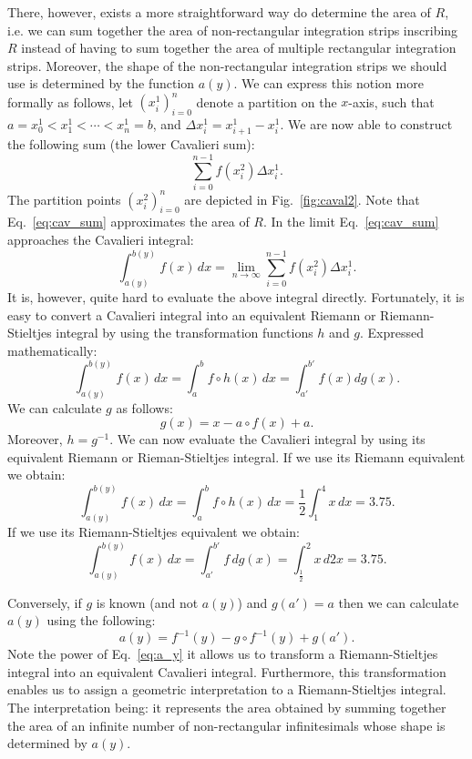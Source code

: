 \documentclass{article}
\theoremstyle{theorem}
\theoremstyle{definition}
\begin{document}
\noindent
There, however, exists a more straightforward way do determine the area of $R$, i.e. we can sum together the area of non-rectangular integration strips inscribing $R$ instead of
having to sum together the area of multiple rectangular integration strips. Moreover, the shape of the non-rectangular integration strips we should use is determined by the function $a(y)$. We can express this notion more formally as 
follows, let $(x_i^1)_{i=0}^{n}$ denote a partition on the $x$-axis, such that $a = x_0^1 < x_1^1 < \cdots < x_n^1 = b$, and $\Delta x_i^1 = x_{i+1}^1 - x_i^1$.
We are now able to construct the following sum (the lower Cavalieri sum):
\begin{equation}
\label{eq:cav_sum}
\sum_{i=0}^{n-1} f(x_i^2)\Delta x_i^1.
\end{equation}
The partition points $(x_i^2)_{i=0}^{n}$ are depicted in Fig.~\ref{fig:caval2}. Note that Eq.~\eqref{eq:cav_sum} approximates the area of $R$. In the limit Eq.~\eqref{eq:cav_sum} approaches 
the Cavalieri integral:
\begin{equation}
\label{eq:caval1}
\int_{a(y)}^{b(y)}f(x)\, dx = \lim_{n\to \infty}\sum_{i=0}^{n-1} f(x_i^2)\Delta x_i^1.
\end{equation}
It is, however, quite hard to evaluate the above integral directly. Fortunately, it is easy to convert a Cavalieri integral into an equivalent Riemann or Riemann-Stieltjes 
integral by using the transformation functions $h$ and $g$. Expressed mathematically:
\begin{equation}
\label{eq:main_cav}
\int_{a(y)}^{b(y)}f(x)\,dx =\int_a^b f \circ h (x)\, dx = \int_{a'}^{b'} f(x) dg(x).
\end{equation}
We can calculate $g$ as follows:
\begin{equation}
g(x) = x - a\circ f(x) + a.
\end{equation}
Moreover, $h=g^{-1}$. We can now evaluate the Cavalieri integral by using its equivalent Riemann or Rieman-Stieltjes integral.
If we use its Riemann equivalent we obtain:
\begin{equation}
\int_{a(y)}^{b(y)}f(x)\, dx = \int_a^b f \circ h (x)\, dx = \dfrac{1}{2}\int_1^4x\, dx = 3.75.  
\end{equation}
If we use its Riemann-Stieltjes equivalent we obtain:
\begin{equation}
\int_{a(y)}^{b(y)}f(x)\, dx = \int_{a'}^{b'} f \, dg(x) = \int_{\frac{1}{2}}^2x\, d2x = 3.75.  
\end{equation}

\noindent
Conversely, if $g$ is known (and not $a(y)$) and $g(a') = a$ then we can calculate $a(y)$ using the following:
\begin{equation}
\label{eq:a_y}
a(y) = f^{-1}(y) - g\circ f^{-1}(y) + g(a'). 
\end{equation}
Note the power of Eq.~\eqref{eq:a_y} it allows us to transform a Riemann-Stieltjes integral into an equivalent Cavalieri integral. 
Furthermore, this transformation enables us to assign a geometric interpretation to a Riemann-Stieltjes integral. The interpretation being:
it represents the area obtained by summing together the area of an infinite number of non-rectangular infinitesimals whose shape is determined by $a(y)$.
\end{document}
